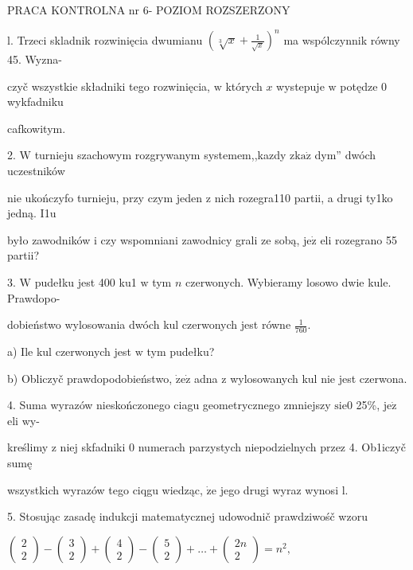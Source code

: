 \documentclass[a4paper,12pt]{article}
\begin{document}
PRACA KONTROLNA nr 6- POZIOM ROZSZERZONY

l. Trzeci skladnik rozwinięcia dwumianu $(\displaystyle \sqrt[3]{x}+\frac{1}{\sqrt{x}})^{n}$ ma wspólczynnik równy 45. Wyzna-

czyč wszystkie składniki tego rozwinięcia, $\mathrm{w}$ których $x$ wystepuje $\mathrm{w}$ potędze $0$ wykfadniku

cafkowitym.

2. $\mathrm{W}$ turnieju szachowym rozgrywanym systemem,,kazdy $\mathrm{z}\mathrm{k}\mathrm{a}\dot{\mathrm{z}}$ dym'' dwóch uczestników

nie ukończyfo turnieju, przy czym jeden $\mathrm{z}$ nich rozegra110 partii, a drugi ty1ko jedną. I1u

było zawodników $\mathrm{i}$ czy wspomniani zawodnicy grali ze sobą, $\mathrm{j}\mathrm{e}\dot{\mathrm{z}}$ eli rozegrano 55 partii?

3. $\mathrm{W}$ pudełku jest 400 ku1 $\mathrm{w}$ tym $n$ czerwonych. Wybieramy losowo dwie kule. Prawdopo-

dobieństwo wylosowania dwóch kul czerwonych jest równe $\displaystyle \frac{1}{760}.$

a) Ile kul czerwonych jest $\mathrm{w}$ tym pudełku?

b) Obliczyč prawdopodobieństwo, $\dot{\mathrm{z}}\mathrm{e}\dot{\mathrm{z}}$ adna $\mathrm{z}$ wylosowanych kul nie jest czerwona.

4. Suma wyrazów nieskończonego ciagu geometrycznego zmniejszy $\mathrm{s}\mathrm{i}\mathrm{e}0$ 25\%, $\mathrm{j}\mathrm{e}\dot{\mathrm{z}}$ eli wy-

kreślimy $\mathrm{z}$ niej skfadniki $0$ numerach parzystych niepodzielnych przez 4. Ob1iczyč sumę

wszystkich wyrazów tego ciqgu wiedząc, $\dot{\mathrm{z}}\mathrm{e}$ jego drugi wyraz wynosi l.

5. Stosując zasadę indukcji matematycznej udowodnič prawdziwośč wzoru

$\left(\begin{array}{l}
2\\
2
\end{array}\right) - \left(\begin{array}{l}
3\\
2
\end{array}\right) + \left(\begin{array}{l}
4\\
2
\end{array}\right) - \left(\begin{array}{l}
5\\
2
\end{array}\right) +\ldots+\left(\begin{array}{l}
2n\\
2
\end{array}\right) =n^{2},$
\end{document}
